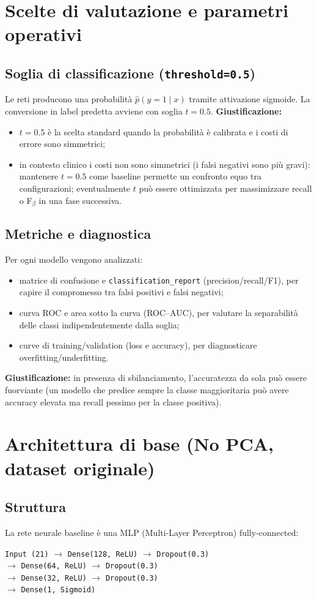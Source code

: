 \section{Scelte di valutazione e parametri operativi}
\subsection{Soglia di classificazione (\texttt{threshold=0.5})}
Le reti producono una probabilità $\hat{p}(y=1\mid x)$ tramite attivazione sigmoide.
La conversione in label predetta avviene con soglia $t=0.5$.
\textbf{Giustificazione:}
\begin{itemize}
  \item $t=0.5$ è la scelta standard quando la probabilità è calibrata e i costi di errore sono simmetrici;
  \item in contesto clinico i costi non sono simmetrici (i falsi negativi sono più gravi): mantenere $t=0.5$ come baseline permette un confronto equo tra configurazioni; eventualmente $t$ può essere ottimizzata per massimizzare recall o F$_\beta$ in una fase successiva.
\end{itemize}

\subsection{Metriche e diagnostica}
Per ogni modello vengono analizzati:
\begin{itemize}
  \item matrice di confusione e \texttt{classification\_report} (precision/recall/F1), per capire il compromesso tra falsi positivi e falsi negativi;
  \item curva ROC e area sotto la curva (ROC--AUC), per valutare la separabilità delle classi indipendentemente dalla soglia;
  \item curve di training/validation (loss e accuracy), per diagnosticare overfitting/underfitting.
\end{itemize}
\textbf{Giustificazione:} in presenza di sbilanciamento, l'accuratezza da sola può essere fuorviante (un modello che predice sempre la classe maggioritaria può avere accuracy elevata ma recall pessimo per la classe positiva).

\section{Architettura di base (No PCA, dataset originale)}
\subsection{Struttura}
La rete neurale baseline è una MLP (Multi-Layer Perceptron) fully-connected:
\begin{center}
\texttt{Input (21)} $\rightarrow$ \texttt{Dense(128, ReLU)} $\rightarrow$ \texttt{Dropout(0.3)} \\
$\rightarrow$ \texttt{Dense(64, ReLU)} $\rightarrow$ \texttt{Dropout(0.3)} \\
$\rightarrow$ \texttt{Dense(32, ReLU)} $\rightarrow$ \texttt{Dropout(0.3)} \\
$\rightarrow$ \texttt{Dense(1, Sigmoid)}
\end{center}


